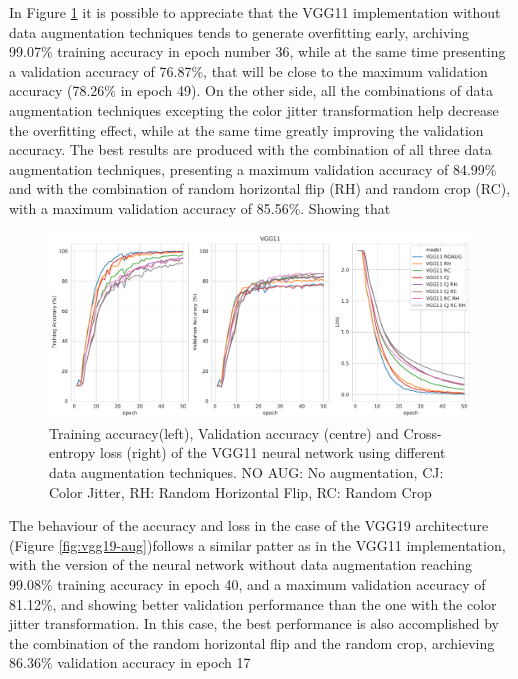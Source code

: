 \documentclass[10pt,twocolumn,letterpaper]{article}
\begin{document}
In Figure \ref{fig:vgg11-aug} it is possible to appreciate that the VGG11 implementation without data augmentation techniques tends to generate overfitting early, archiving 99.07\% training accuracy in epoch number 36, while at the same time presenting a validation accuracy of 76.87\%, that will be close to the maximum validation accuracy (78.26\% in epoch 49). On the other side, all the combinations of data augmentation techniques excepting the color jitter transformation help decrease the overfitting effect, while at the same time greatly improving the validation accuracy. The best results are produced with the combination of all three data augmentation techniques, presenting a maximum validation accuracy of 84.99\% and with the combination of random horizontal flip (RH) and random crop (RC), with a maximum validation accuracy of 85.56\%. Showing that 

\begin{figure}[h]
	\begin{center}
		\includegraphics[width=1.0\linewidth]{vgg11_aug.pdf}
		\caption{Training accuracy(left), Validation accuracy (centre) and Cross-entropy loss (right) of the VGG11 neural network using different data augmentation techniques. NO AUG: No augmentation, CJ: Color Jitter, RH: Random Horizontal Flip, RC: Random Crop}
		\label{fig:vgg11-aug}
	\end{center}
\end{figure}

The behaviour of the accuracy and loss in the case of the VGG19 architecture (Figure \ref{fig:vgg19-aug})follows a similar patter as in the VGG11 implementation, with the version of the neural network without data augmentation reaching 99.08\% training accuracy in epoch 40, and a maximum validation accuracy of 81.12\%, and showing better validation performance than the one with the color jitter transformation. In this case, the best performance is also accomplished by the combination of the random horizontal flip and the random crop, archieving 86.36\% validation accuracy in epoch 17
\end{document}

